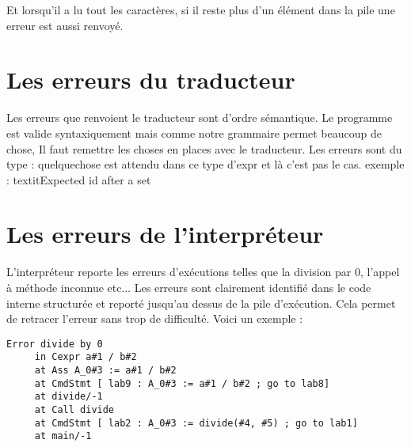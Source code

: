 Et lorsqu'il a lu tout les caractères, si il reste plus d'un élément dans la pile une erreur est aussi renvoyé.
\section{Les erreurs du traducteur}
    Les erreurs que renvoient le traducteur sont d'ordre sémantique. Le programme est valide syntaxiquement mais comme notre grammaire permet beaucoup de chose,
Il faut remettre les choses en places avec le traducteur. Les erreurs sont du type : quelquechose est attendu dans ce type d'expr et là c'est pas le cas. 
exemple : textit{Expected id after a set}


\section{Les erreurs de l'interpréteur}
  L'interpréteur reporte les erreurs d'exécutions telles que la division par 0, l'appel à méthode inconnue etc...
  Les erreurs sont clairement identifié dans le code interne structurée et reporté jusqu'au dessus de la pile d'exécution. Cela permet de retracer l'erreur
sans trop de difficulté. 
Voici un exemple : 
\begin{verbatim}
Error divide by 0
	 in Cexpr a#1 / b#2
	 at Ass A_0#3 := a#1 / b#2
	 at CmdStmt [ lab9 : A_0#3 := a#1 / b#2 ; go to lab8]
	 at divide/-1
	 at Call divide
	 at CmdStmt [ lab2 : A_0#3 := divide(#4, #5) ; go to lab1]
	 at main/-1
\end{verbatim}
